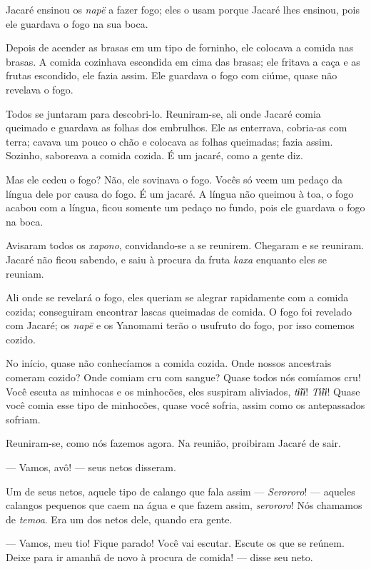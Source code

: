 Jacaré ensinou os \textit{napë} a fazer fogo; eles o usam porque Jacaré
lhes ensinou, pois ele guardava o fogo na sua boca.

Depois de acender as brasas em um tipo de forninho, ele colocava a
comida nas brasas. A comida cozinhava escondida em cima das brasas; ele
fritava a caça e as frutas escondido, ele fazia assim. Ele
guardava o fogo com ciúme, quase não revelava o fogo. 

Todos se juntaram para descobri-lo. Reuniram-se, ali onde Jacaré comia
queimado e guardava as folhas dos embrulhos. Ele as enterrava, cobria-as
com terra; cavava um pouco o chão e colocava as folhas queimadas; fazia assim. Sozinho, saboreava a comida cozida. É um jacaré, como a gente
diz.

Mas ele cedeu o fogo? Não, ele sovinava o fogo. Vocês só veem um pedaço
da língua dele por causa do fogo. É um jacaré. A língua não queimou à
toa, o fogo acabou com a língua, ficou somente um pedaço no fundo, pois
ele guardava o fogo na boca. 

Avisaram todos os \textit{xapono}, convidando-se a se reunirem. Chegaram e se
reuniram. Jacaré não ficou sabendo, e saiu à procura da
fruta \textit{kaxa} enquanto eles se reuniam. 

Ali onde se revelará o fogo, eles queriam se alegrar rapidamente com a comida
cozida; conseguiram encontrar lascas queimadas de comida. O fogo foi revelado com Jacaré; os \textit{napë} e os Yanomami terão o usufruto do fogo,
por isso comemos cozido.

No início, quase não conhecíamos a comida cozida. Onde nossos ancestrais
comeram cozido? Onde comiam cru com sangue? Quase todos nós comíamos
cru! Você escuta as minhocas e os minhocões, eles suspiram
aliviados, \textit{tɨ̃ɨɨ}! \textit{Tɨ̃ɨɨ}! Quase você comia esse tipo de
minhocões, quase você sofria, assim como os antepassados sofriam. 

Reuniram-se, como nós fazemos agora. Na reunião, proibiram Jacaré de sair. 

--- Vamos, avô! --- seus netos disseram. 

Um de seus netos, aquele tipo de calango que fala
assim --- \textit{Serororo}! --- aqueles calangos pequenos que caem na água e
que fazem assim, \textit{serororo}! Nós chamamos de \textit{temoa}. Era um
dos netos dele, quando era gente. 

--- Vamos, meu tio! Fique parado! Você vai escutar. Escute os que se
reúnem. Deixe para ir amanhã de novo à procura de comida! --- disse seu
neto. 

